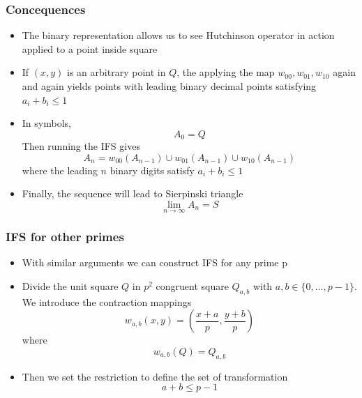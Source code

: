 \documentclass{beamer}
\begin{document}
\begin{frame}
    \frametitle{Concequences}
    \begin{itemize}
        \item The binary representation allows us to see Hutchinson operator in action applied to a point inside square
        \item If $(x,y)$ is an arbitrary point in $Q$, the applying the map $w_{00},w_{01},w_{10}$ again and again yields points with leading binary decimal points satisfying $a_i + b_i \leq 1$
        \item In symbols,
        \begin{equation*}
            A_0 = Q
        \end{equation*} 
        Then running the IFS gives 
        \begin{equation*}
            A_n = w_{00}(A_{n-1}) \cup w_{01}(A_{n-1}) \cup w_{10}(A_{n-1})
        \end{equation*}
        where the leading $n$ binary digits satisfy $a_i + b_i \leq 1$
        \item Finally, the sequence will lead to Sierpinski triangle
        \begin{equation*}
            \lim_{n \to \infty} A_n = S
        \end{equation*}
    \end{itemize}
\end{frame}

\begin{frame}
    \frametitle{IFS for other primes}
    \begin{itemize}
        \item With similar arguments we can construct IFS for any prime p
        \item Divide the unit square $Q$ in $p^2$ congruent square $Q_{a,b}$ with $a,b \in \{0,\dots,p-1\}$. We introduce the contraction mappings 
        \begin{equation*}
            w_{a,b}(x,y) = \left(\frac{x+a}{p}, \frac{y+b}{p}\right)
        \end{equation*} 
        where 
        \begin{equation*}
            w_{a,b}(Q) = Q_{a,b}
        \end{equation*}
        \item Then we set the restriction to define the set of transformation
        \begin{equation*}
            a+b \leq p-1
        \end{equation*}
        
    \end{itemize}
\end{frame}
\end{document}
